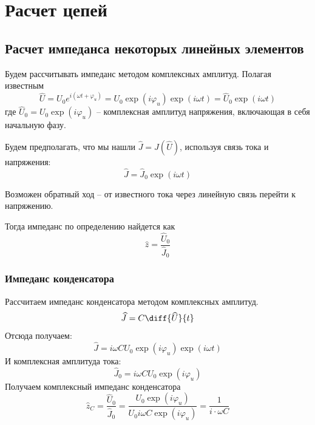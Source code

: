 
\usepackage{setspace}



\def\labauthors{Понур К.А., Сарафанов Ф.Г., Сидоров Д.А.}
\def\labgroup{420}
\def\labnumber{210}
\def\labtheme{Исследование линейных двухполюсников и четырёхполюсников}
\renewcommand{\vec}{\mathbf}
\renewcommand{\Re}{\operatorname{Re}}
\renewcommand{\Im}{\operatorname{Im}}
\renewcommand{\phi}{\varphi}
\renewcommand{\kappa}{\varkappa}
\renewcommand{\hat}{\widehat}

\begin{spacing}{1}
\tableofcontents
\end{spacing}
\newpage
 
\section{Расчет цепей}
\subsection{Расчет импеданса некоторых линейных элементов}

Будем рассчитывать импеданс методом комплексных амплитуд.
Полагая известным
\begin{equation}
	\hat{U}=
	U_0 e^{i(\omega t+\phi_u)}=
	U_0\exp(i\phi_u)\exp(i\omega t)=
	\hat{U}_0\exp(i\omega t)
\end{equation}
где	$\hat{U}_0=U_0\exp(i\phi_u)$ -- комплексная амплитуд напряжения, включающая в себя начальную фазу.

Будем предполагать, что мы нашли $\hat{J}=\hat{J}(\hat{U})$, используя связь тока и напряжения:
\begin{equation}
	\hat{J}=\hat{J}_0\exp(i\omega t)
\end{equation}

Возможен обратный ход -- от известного тока через линейную связь перейти к напряжению.

Тогда импеданс по определению найдется как
\begin{equation}
	\hat{z}=\frac{\hat{U}_0}{\hat{J}_0}
\end{equation}
\subsubsection{Импеданс конденсатора}
Рассчитаем импеданс конденсатора методом комплексных амплитуд.
\begin{equation}
	\hat{J}=C\diff{\hat{U}}{t}
\end{equation}
Отсюда получаем:
\begin{equation}
	\hat{J}=i\omega C U_0\exp(i\phi_u)\exp(i\omega t)
\end{equation}
И комплексная амплитуда тока:
\begin{equation}
	\hat{J}_0=i\omega C U_0\exp(i\phi_u)
\end{equation}
Получаем комплексный импеданс конденсатора
\begin{equation}
	\hat{z}_C=\frac{\hat{U}_0}{\hat{J}_0}=\frac{U_0\exp(i\phi_u)}{U_0i\omega C \exp(i\phi_u)}=\frac{1}{i\cdot\omega C}
\end{equation}

